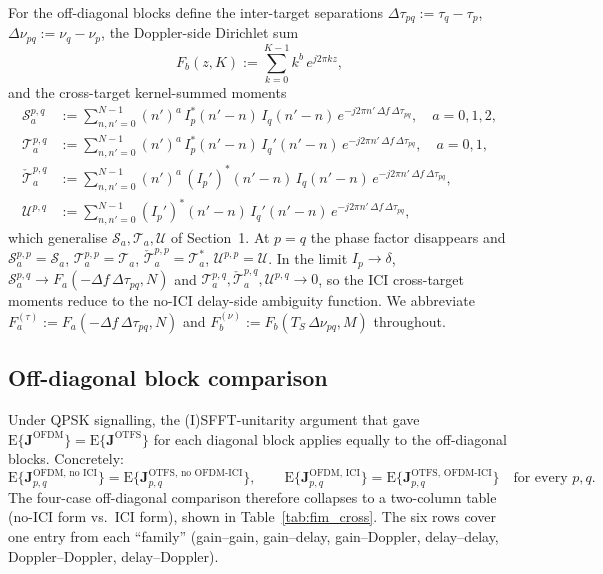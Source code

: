 \documentclass[11pt]{article}
\begin{document}
For the off-diagonal blocks define the inter-target separations
\(\Delta\tau_{pq} := \tau_q - \tau_p\),
\(\Delta\nu_{pq} := \nu_q - \nu_p\), the Doppler-side Dirichlet sum
\begin{equation}
    F_b(z,K) := \sum_{k=0}^{K-1} k^b\, e^{j2\pi kz},
\end{equation}
and the cross-target kernel-summed moments
\begin{align}
    \mathcal{S}_a^{p,q} &:= \sum_{n,n'=0}^{N-1} (n')^a\,
        I_p^*(n'-n)\, I_q(n'-n)\,
        e^{-j2\pi n'\,\Delta f\,\Delta\tau_{pq}},\quad a=0,1,2, \\
    \mathcal{T}_a^{p,q} &:= \sum_{n,n'=0}^{N-1} (n')^a\,
        I_p^*(n'-n)\, I_q'(n'-n)\,
        e^{-j2\pi n'\,\Delta f\,\Delta\tau_{pq}},\quad a=0,1, \\
    \check{\mathcal{T}}_a^{p,q} &:= \sum_{n,n'=0}^{N-1} (n')^a\,
        (I_p')^*(n'-n)\, I_q(n'-n)\,
        e^{-j2\pi n'\,\Delta f\,\Delta\tau_{pq}}, \\
    \mathcal{U}^{p,q} &:= \sum_{n,n'=0}^{N-1}
        (I_p')^*(n'-n)\, I_q'(n'-n)\,
        e^{-j2\pi n'\,\Delta f\,\Delta\tau_{pq}},
\end{align}
which generalise \(\mathcal{S}_a,\mathcal{T}_a,\mathcal{U}\) of
Section~1. At \(p=q\) the phase factor disappears and
\(\mathcal{S}_a^{p,p}=\mathcal{S}_a\),
\(\mathcal{T}_a^{p,p}=\mathcal{T}_a\),
\(\check{\mathcal{T}}_a^{p,p}=\mathcal{T}_a^*\),
\(\mathcal{U}^{p,p}=\mathcal{U}\). In the limit \(I_p\to\delta\),
\(\mathcal{S}_a^{p,q}\to F_a(-\Delta f\,\Delta\tau_{pq},N)\) and
\(\mathcal{T}_a^{p,q},\check{\mathcal{T}}_a^{p,q},\mathcal{U}^{p,q}\to 0\),
so the ICI cross-target moments reduce to the no-ICI delay-side
ambiguity function. We abbreviate
\(F_a^{(\tau)} := F_a(-\Delta f\,\Delta\tau_{pq},N)\) and
\(F_b^{(\nu)} := F_b(T_S\,\Delta\nu_{pq},M)\) throughout.

\subsection*{Off-diagonal block comparison}

Under QPSK signalling, the (I)SFFT-unitarity argument that gave
\(\mathrm{E}\{\bm{J}^{\text{OFDM}}\}=\mathrm{E}\{\bm{J}^{\text{OTFS}}\}\)
for each diagonal block applies equally to the off-diagonal blocks.
Concretely:
\begin{equation}
    \mathrm{E}\{\bm{J}_{p,q}^{\text{OFDM, no ICI}}\}
    = \mathrm{E}\{\bm{J}_{p,q}^{\text{OTFS, no OFDM-ICI}}\},
    \qquad
    \mathrm{E}\{\bm{J}_{p,q}^{\text{OFDM, ICI}}\}
    = \mathrm{E}\{\bm{J}_{p,q}^{\text{OTFS, OFDM-ICI}}\}
    \quad\text{for every } p,q.
\end{equation}
The four-case off-diagonal comparison therefore collapses to a
two-column table (no-ICI form vs.\ ICI form), shown in
Table~\ref{tab:fim_cross}. The six rows cover one entry from each
``family'' (gain--gain, gain--delay, gain--Doppler, delay--delay,
Doppler--Doppler, delay--Doppler).
\end{document}
